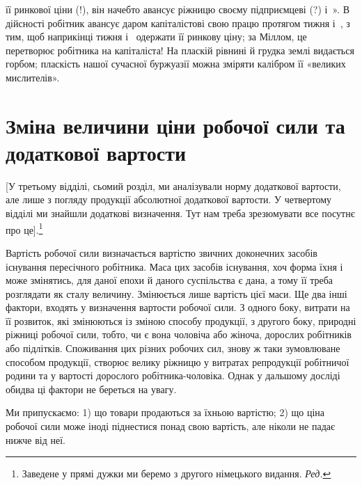 \parcont{}  %
її ринкової ціни (!), він начебто авансує ріжницю своєму підприємцеві
(?) і~». В дійсності робітник авансує даром
капіталістові свою працю протягом тижня і~, з тим, щоб
наприкінці тижня і~ одержати її ринкову ціну; за Міллом,
це перетворює робітника на капіталіста! На пласкій рівнині
й грудка землі видається горбом; пласкість нашої сучасної буржуазії
можна зміряти калібром її «великих мислителів».

\section{Зміна величини ціни робочої сили та додаткової
вартости}

[У третьому відділі, сьомий розділ, ми аналізували норму
додаткової вартости, але лише з погляду продукції абсолютної
додаткової вартости. У четвертому відділі ми знайшли додаткові
визначення. Тут нам треба зрезюмувати все посутнє про це].\footnote*{
Заведене у прямі дужки ми беремо з другого німецького видання.
\emph{Ред.}
}

Вартість робочої сили визначається вартістю звичних доконечних
засобів існування пересічного робітника. Маса цих засобів
існування, хоч форма їхня і може змінятись, для даної епохи
й даного суспільства є дана, а тому її треба розглядати як сталу
величину. Змінюється лише вартість цієї маси. Ще два інші
фактори, входять у визначення вартости робочої сили. З одного
боку, витрати на її розвиток, які змінюються із зміною способу
продукції, з другого боку, природні ріжниці робочої сили, тобто,
чи є вона чоловіча або жіноча, дорослих робітників або підлітків.
Споживання цих різних робочих сил, знову ж таки зумовлюване
способом продукції, створює велику ріжницю у витратах репродукції
робітничої родини та у вартості дорослого робітника-чоловіка.
Однак у дальшому досліді обидва ці фактори не береться
на увагу.

Ми припускаємо: 1) що товари продаються за їхньою вартістю;
2) що ціна робочої сили може іноді піднестися понад свою вартість,
але ніколи не падає нижче від неї.

